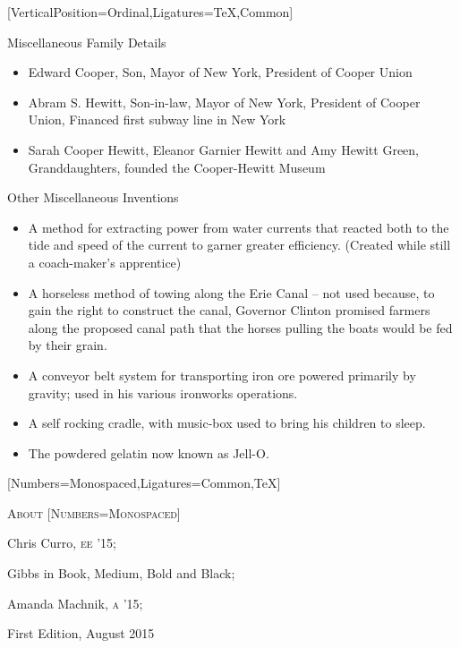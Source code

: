 \documentclass{article}
\begin{document}
\begin{minipage}[t]{0.46\linewidth}
[VerticalPosition=Ordinal,Ligatures={TeX,Common}]
\fontsize{11pt}{13pt}\selectfont
\raggedright
\upshape
\begin{enumList}
\setcounter{enumListi}{\value{enumTemp}}

\item Miscellaneous Family Details
\begin{itemize}[leftmargin=*]
\item Edward Cooper, Son, Mayor of New York, President of Cooper Union
\item Abram S. Hewitt, Son-in-law, Mayor of New York, President of Cooper Union,
Financed first subway line in New York
\item Sarah Cooper Hewitt, Eleanor Garnier Hewitt and Amy Hewitt Green,
Granddaughters, founded the Cooper-Hewitt Museum
\end{itemize}

\item Other Miscellaneous Inventions
\begin{itemize}[leftmargin=*]
\item A method for extracting power from water currents that reacted both to the
tide and speed of the current to garner greater efficiency. (Created while
still a coach-maker's apprentice)
\item A horseless method of towing along the Erie Canal -- not used because, to gain the right to construct the canal, Governor Clinton promised
farmers along the proposed canal path that the horses pulling the boats would be fed by their grain.
\item A conveyor belt system for transporting iron ore powered
primarily by gravity; used in his various ironworks operations.
\item A self rocking cradle, with music-box used to bring his children to sleep.
\item The powdered gelatin now known as Jell-O.
\end{itemize}
\end{enumList}


[Numbers=Monospaced,Ligatures={Common,TeX}]
\fontsize{9.5pt}{9.5pt}\selectfont
\upshape
\raggedright
\nocite{*}



\vspace{0.1in}

\scshape \fontsize{16pt}{16pt}\selectfont {} About
[Numbers=Monospaced]
\fontsize{10pt}{10pt}\selectfont
\upshape
\raggedright

\begin{description}
\itemsep1pt
\item[Contributors:] Chris Curro, {\scshape ee '15}; 
\item[Typefaces:] Gibbs in Book, Medium, Bold and Black;
\item[Special Thanks:] Amanda Machnik, {\scshape a '15};
\item[Printing:] First Edition, August 2015
\end{description}
\end{minipage}
\end{document}
